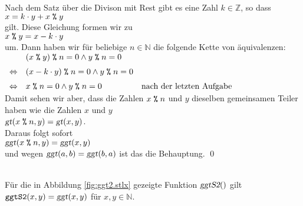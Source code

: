 \proof
Nach dem Satz \"{u}ber die Divison mit Rest gibt es eine Zahl $k \in \mathbb{Z}$, so dass
\\[0.2cm]
\hspace*{1.3cm}
$x = k \cdot y + x \;\texttt{\%}\; y$
\\[0.2cm]
gilt.  Diese Gleichung formen wir zu
\\[0.2cm]
\hspace*{1.3cm}
$x \;\texttt{\%}\; y = x - k \cdot y$
\\[0.2cm]
um.  Dann haben wir f\"{u}r beliebige $n \in \mathbb{N}$ die folgende Kette von \"{a}quivalenzen:
\\[0.2cm]
\hspace*{1.3cm}
$
\begin{array}[t]{lll}
                & (x \;\texttt{\%}\; y)   \;\texttt{\%}\; n = 0 \wedge y \;\texttt{\%}\; n = 0   \\[0.2cm]
\Leftrightarrow & (x - k \cdot y) \;\texttt{\%}\; n = 0 \wedge y \;\texttt{\%}\; n = 0   \\[0.2cm]
\Leftrightarrow & x \;\texttt{\%}\; n = 0 \wedge y \;\texttt{\%}\; n = 0               &
                  \mbox{nach der letzten Aufgabe}                        
\end{array}
$
\\[0.2cm]
Damit sehen wir aber, dass die Zahlen $x \;\texttt{\%}\; n$ und $y$ dieselben gemeinsamen Teiler haben wie
die Zahlen $x$ und $y$
\\[0.2cm]
\hspace*{1.3cm}
$\textsl{gt}(x \;\texttt{\%}\; n, y) = \textsl{gt}(x,y)$.
\\[0.2cm]
Daraus folgt sofort
\\[0.2cm]
\hspace*{1.3cm}
$\textsl{ggt}(x \;\texttt{\%}\; n, y) = \textsl{ggt}(x,y)$
\\[0.2cm]
und wegen $\textsl{ggt}(a,b) = \textsl{ggt}(b,a)$ ist das die Behauptung. \qed

\begin{Satz} \hspace*{\fill} \\
F\"{u}r die in Abbildung \ref{fig:ggt2.stlx} gezeigte Funktion $\textsl{ggtS2}()$ gilt
\\[0.2cm]
\hspace*{1.3cm}
$\texttt{ggtS2}(x,y) = \textsl{ggt}(x,y)$ \quad f\"{u}r $x,y \in \mathbb{N}$.
\end{Satz}

